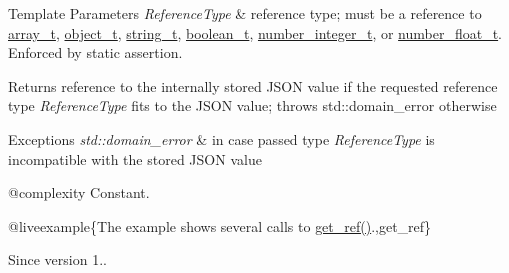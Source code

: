 \begin{DoxyTemplParams}{Template Parameters}
{\em Reference\+Type} & reference type; must be a reference to \mbox{\hyperlink{classnlohmann_1_1basic__json_ae095578e03df97c5b3991787f1056374}{array\+\_\+t}}, \mbox{\hyperlink{classnlohmann_1_1basic__json_aa1eb13d5aa86f80cbee6c58e90fbaf49}{object\+\_\+t}}, \mbox{\hyperlink{classnlohmann_1_1basic__json_a61f8566a1a85a424c7266fb531dca005}{string\+\_\+t}}, \mbox{\hyperlink{classnlohmann_1_1basic__json_a4c919102a9b4fe0d588af64801436082}{boolean\+\_\+t}}, \mbox{\hyperlink{classnlohmann_1_1basic__json_a98e611d67b7bd75307de99c9358ab2dc}{number\+\_\+integer\+\_\+t}}, or \mbox{\hyperlink{classnlohmann_1_1basic__json_a88d6103cb3620410b35200ee8e313d97}{number\+\_\+float\+\_\+t}}. Enforced by static assertion.\\
\hline
\end{DoxyTemplParams}
\begin{DoxyReturn}{Returns}
reference to the internally stored J\+S\+ON value if the requested reference type {\itshape Reference\+Type} fits to the J\+S\+ON value; throws std\+::domain\+\_\+error otherwise
\end{DoxyReturn}

\begin{DoxyExceptions}{Exceptions}
{\em std\+::domain\+\_\+error} & in case passed type {\itshape Reference\+Type} is incompatible with the stored J\+S\+ON value\\
\hline
\end{DoxyExceptions}
@complexity Constant.

@liveexample\{The example shows several calls to {\ttfamily \mbox{\hyperlink{classnlohmann_1_1basic__json_afbd800010b67619463c0fce6e74f7878}{get\+\_\+ref()}}}.,get\+\_\+ref\}

\begin{DoxySince}{Since}
version 1.. 
\end{DoxySince}
\mbox{\label{classnlohmann_1_1basic__json_a0136728f5db69d4051c77b94307abd6c}} 
